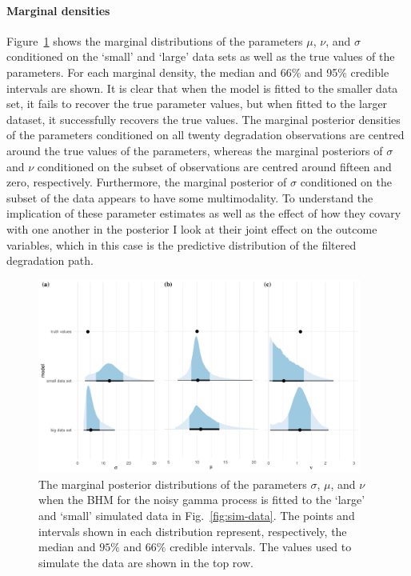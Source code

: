\paragraph*{Marginal densities}
Figure~\ref{fig:marginal-post} shows the marginal distributions of the parameters $\mu$, $\nu$, and $\sigma$ conditioned on the `small' and `large' data sets as well as the true values of the parameters. For each marginal density, the median and 66\% and 95\% credible intervals are shown. It is clear that when the model is fitted to the smaller data set, it fails to recover the true parameter values, but when fitted to the larger dataset, it successfully recovers the true values. The marginal posterior densities of the parameters conditioned on all twenty degradation observations are centred around the true values of the parameters, whereas the marginal posteriors of $\sigma$ and $\nu$ conditioned on the subset of observations are centred around fifteen and zero, respectively. Furthermore, the marginal posterior of $\sigma$ conditioned on the subset of the data appears to have some multimodality. To understand the implication of these parameter estimates as well as the effect of how they covary with one another in the posterior I look at their joint effect on the outcome variables, which in this case is the predictive distribution of the filtered degradation path.

\begin{figure}
  \centering
  \includegraphics[width=0.95\textwidth]{./figures/ch-4/marginal-posterior_a.pdf}
  \caption{The marginal posterior distributions of the parameters $\sigma$, $\mu$, and $\nu$ when the BHM for the noisy gamma process is fitted to the `large' and `small' simulated data in Fig.~\ref{fig:sim-data}. The points and intervals shown in each distribution represent, respectively, the median and $95\%$ and $66\%$ credible intervals. The values used to simulate the data are shown in the top row.}
  \label{fig:marginal-post}
\end{figure}

